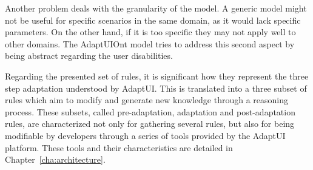 Another problem deals with the granularity of the model. A generic model might
not be useful for specific scenarios in the same domain, as it would lack specific
parameters. On the other hand, if it is too specific they may not apply well to
other domains. The AdaptUIOnt model tries to address this second aspect by being
abstract regarding the user disabilities. 

Regarding the presented set of rules, it is significant how they represent the
three step adaptation understood by AdaptUI. This is translated into a three
subset of rules which aim to modify and generate new knowledge through a reasoning
process. These subsets, called pre-adaptation, adaptation and post-adaptation rules,
are characterized not only for gathering several rules, but also for being modifiable
by developers through a series of tools provided by the AdaptUI platform. These
tools and their characteristics are detailed in Chapter~\ref{cha:architecture}.